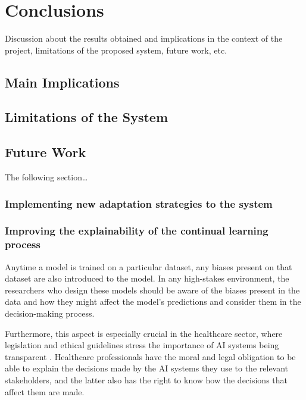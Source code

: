\documentclass[../main.tex]{subfiles}
\begin{document}
\chapter{Conclusions} \label{chap:conclusions} 
    

    Discussion about the results obtained and implications in the context of the project, limitations of the proposed system, future work, etc.
    

    \section{Main Implications} \label{conclusions:implications} 

    \section{Limitations of the System} \label{conclusions:limitations} 
    
    \section{Future Work} \label{conclusions:future_work} 

    The following section\dots

    \subsection{
        Implementing new adaptation strategies to the system 
    } \label{conclusions:future_work:adaptation_strategies}


    \subsection{
        Improving the explainability of the continual learning process 
    } \label{conclusions:future_work:explainability}

    Anytime a model is trained on a particular dataset, any biases present on that dataset are also introduced to the model. In any high-stakes environment, the researchers who design these models should be aware of the biases present in the data and how they might affect the model's predictions and consider them in the decision-making process.

    Furthermore, this aspect is especially crucial in the healthcare sector, where legislation and ethical guidelines stress the importance of AI systems being transparent \cite{noauthor_ethics_2019,eu_aiact_2023}. Healthcare professionals have the moral and legal obligation to be able to explain the decisions made by the AI systems they use to the relevant stakeholders, and the latter also has the right to know how the decisions that affect them are made.
    
\end{document}
